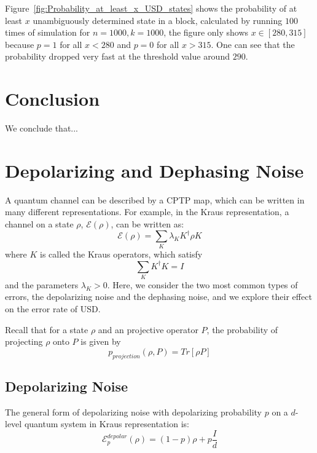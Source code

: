 \documentclass[%
 reprint,
superscriptaddress,
 amsmath,amssymb,
 aps,
]{revtex4-2}
\begin{document}
Figure~\ref{fig:Probability_at_least_x_USD_states} shows the probability of at least $x$ unambiguously determined state in a block, calculated by running $100$ times of simulation for $n=1000, k=1000$, the figure only shows $x\in[280, 315]$ because $p=1$ for all $x<280$ and $p=0$ for all $x>315$. One can see that the probability dropped very fast at the threshold value around $290$.

\section{Conclusion}
We conclude that...



\appendix

\section{Depolarizing and Dephasing Noise}
A quantum channel can be described by a CPTP map, which can be written in many different representations. For example, in the Kraus representation, a channel on a state $\rho$, $\mathcal{E}(\rho)$, can be written as:
\begin{equation}
    \mathcal{E}(\rho)=\sum_K \lambda_K K^\dagger\rho K
\end{equation}
where $K$ is called the Kraus operators, which satisfy 
\begin{equation}
    \sum_KK^\dagger K=I
\end{equation}
and the parameters $\lambda_K>0$.
Here, we consider the two most common types of errors, the depolarizing noise and the dephasing noise, and we explore their effect on the error rate of USD.

Recall that for a state $\rho$ and an projective operator $P$, the probability of projecting $\rho$ onto $P$ is given by
\begin{equation}
    p_{projection}(\rho, P)=Tr[\rho P]
\end{equation}

\subsection{Depolarizing Noise}
The general form of depolarizing noise with depolarizing probability $p$ on a $d$-level quantum system in Kraus representation is:
\begin{equation}
    \mathcal{E}^{depolar}_{p}(\rho)=(1-p)\rho+p\frac{I}{d}
\end{equation}
\end{document}
